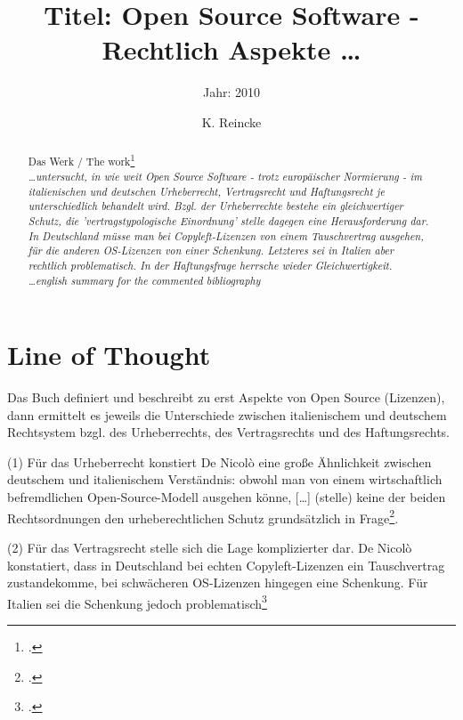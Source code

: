 \documentclass[DIV=calc,BCOR=5mm,11pt,headings=small,oneside,abstract=true, toc=bib]{scrartcl}
\begin{document}

\titlehead{Literaturexzerpt}
\subject{Autor(en): De Nicolò}
\title{Titel: Open Source Software - Rechtlich Aspekte \ldots}
\subtitle{Jahr: 2010 }
\author{K. Reincke}

\maketitle

\begin{abstract}
\noindent
Das Werk / The work\footcite[][]{DeNicolo2010a} \\
\noindent \itshape
\ldots untersucht, in wie weit Open Source Software - trotz europäischer
Normierung - im italienischen und deutschen Urheberrecht, Vertragsrecht und
Haftungsrecht je unterschiedlich behandelt wird. Bzgl. der Urheberrechte bestehe
ein gleichwertiger Schutz, die 'vertragstypologische Einordnung' stelle dagegen
eine Herausforderung dar. In Deutschland müsse man bei Copyleft-Lizenzen von
einem Tauschvertrag ausgehen, für die anderen OS-Lizenzen von einer Schenkung.
Letzteres sei in Italien aber rechtlich problematisch. In der Haftungsfrage
herrsche wieder Gleichwertigkeit. \\
\noindent
\ldots english summary for the commented bibliography
\end{abstract}
\footnotesize
\normalsize

\section{Line of Thought}
Das Buch definiert und beschreibt zu erst Aspekte von Open Source (Lizenzen),
dann ermittelt es jeweils die Unterschiede zwischen italienischem und deutschem
Rechtsystem bzgl. des Urheberrechts, des Vertragsrechts und des Haftungsrechts.

(1) Für das Urheberrecht konstiert De Nicolò eine große Ähnlichkeit zwischen
deutschem und italienischem Verständnis: obwohl man von einem
\glqq{}wirtschaftlich befremdlichen Open-Source-Modell\grqq{} ausgehen könne,
\glqq{}[\ldots] (stelle) keine der beiden Rechtsordnungen den urheberechtlichen
Schutz grundsätzlich in Frage\grqq{}\footcite[vgl.][98]{DeNicolo2010a}.

(2) Für das Vertragsrecht stelle sich die Lage komplizierter dar. De Nicolò
konstatiert, dass in Deutschland bei echten \glqq{}Copyleft-Lizenzen\grqq{} ein
\glqq{}Tauschvertrag\grqq{} zustandekomme, bei schwächeren OS-Lizenzen hingegen
eine \glqq{}Schenkung\grqq{}. Für Italien sei die Schenkung jedoch
problematisch\footcite[vgl.][144]{DeNicolo2010a}
\end{document}
